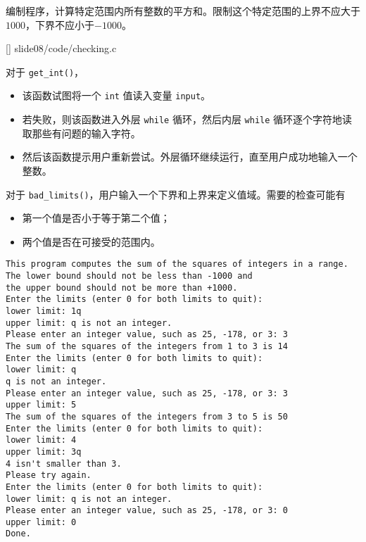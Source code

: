 \begin{frame}[fragile]\ft{\secname}
  \begin{free}[例]{}
    编制程序，计算特定范围内所有整数的平方和。限制这个特定范围的上界不应大于$1000$，下界不应小于$-1000$。
  \end{free}

\end{frame}


\begin{frame}\ft{\secname}

[]
{slide08/code/checking.c}
\end{frame}

\begin{frame}[fragile]\ft{\secname}
  对于 \lstinline|get_int()|，
\begin{itemize}
\item 
该函数试图将一个 \lstinline|int| 值读入变量 \lstinline|input|。\\[0.1in]
\item 
若失败，则该函数进入外层 \lstinline|while| 循环，然后内层 \lstinline|while| 循环逐个字符地读取那些有问题的输入字符。\\[0.1in]
\item
然后该函数提示用户重新尝试。外层循环继续运行，直至用户成功地输入一个整数。
\end{itemize}

\end{frame}

\begin{frame}[fragile]\ft{\secname}
对于 \lstinline|bad_limits()|，用户输入一个下界和上界来定义值域。需要的检查可能有 \vspace{.1in}
\begin{itemize}
\item 第一个值是否小于等于第二个值；\\[0.1in]
\item 两个值是否在可接受的范围内。
\end{itemize}
\end{frame}

\begin{frame}\ft{\secname}
  \begin{lstlisting}[basicstyle=\ttfamily\small]
This program computes the sum of the squares of integers in a range.
The lower bound should not be less than -1000 and
the upper bound should not be more than +1000.
Enter the limits (enter 0 for both limits to quit):
lower limit: 1q
upper limit: q is not an integer.
Please enter an integer value, such as 25, -178, or 3: 3
The sum of the squares of the integers from 1 to 3 is 14
Enter the limits (enter 0 for both limits to quit):
lower limit: q
q is not an integer.
Please enter an integer value, such as 25, -178, or 3: 3
upper limit: 5
The sum of the squares of the integers from 3 to 5 is 50
Enter the limits (enter 0 for both limits to quit):
lower limit: 4
upper limit: 3q
4 isn't smaller than 3.
Please try again.
Enter the limits (enter 0 for both limits to quit):
lower limit: q is not an integer.
Please enter an integer value, such as 25, -178, or 3: 0
upper limit: 0
Done.
\end{lstlisting}
\end{frame}



